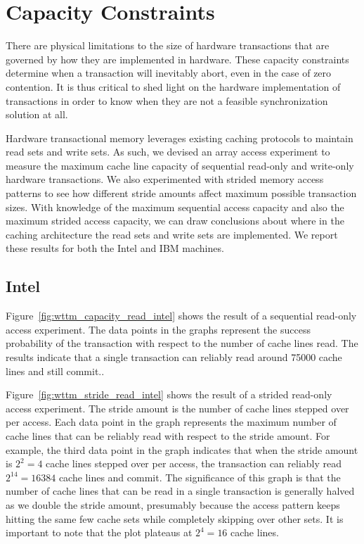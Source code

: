 
\section{Capacity Constraints}
There are physical limitations to the size of hardware transactions that are
governed by how they are implemented in hardware. These capacity constraints
determine when a transaction will inevitably abort, even in the case of zero
contention. It is thus critical to shed light on the hardware implementation of
transactions in order to know when they are not a feasible synchronization
solution at all.

Hardware transactional memory leverages existing caching protocols to maintain
read sets and write sets. As such, we devised an array access experiment to
measure the maximum cache line capacity of sequential read-only and write-only
hardware transactions. We also experimented with strided memory access patterns
to see how different stride amounts affect maximum possible transaction sizes.
With knowledge of the maximum sequential access capacity and also the maximum
strided access capacity, we can draw conclusions about where in the caching
architecture the read sets and write sets are implemented. We report these
results for both the Intel and IBM machines.

\subsection*{Intel}

Figure~\ref{fig:wttm_capacity_read_intel} shows the result of a sequential
read-only access experiment. The data points in the graphs represent the success
probability of the transaction with respect to the number of cache lines read.
The results indicate that a single transaction can reliably read 
around 75000 cache lines and still commit..

Figure~\ref{fig:wttm_stride_read_intel} shows the result of a strided read-only
access experiment. The stride amount is the number of cache lines stepped over
per access. Each data point in the graph represents the maximum number of cache
lines that can be reliably read with respect to the stride amount. For example,
the third data point in the graph indicates that when the stride amount is
$2^2=4$ cache lines stepped over per access, the transaction can reliably read
$2^{14}=16384$ cache lines and commit. The significance of this graph is that
the number of cache lines that can be read in a single transaction is generally
halved as we double the stride amount, presumably because the access pattern
keeps hitting the same few cache sets while completely skipping over other sets.
It is important to note that the plot plateaus at $2^4=16$ cache lines.

